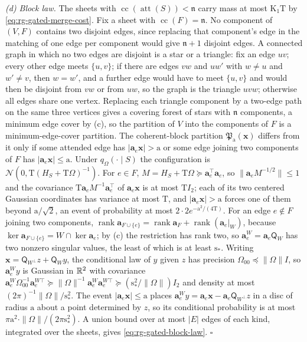 \emph{(d) Block law.} The sheets with
\(\operatorname{cc}(\operatorname{att}(S))<\mathfrak n\) carry mass at most
\(\mathrm K_1\mathrm T\) by \cref{eq:rg-gated-merge-cost}. Fix a sheet with
\(\operatorname{cc}(F)=\mathfrak n\). No component of \((V,F)\) contains
two disjoint edges, since replacing that component's edge in the matching of
one edge per component would give \(\mathfrak n+1\) disjoint edges. A
connected graph in which no two edges are disjoint is a star or a triangle:
fix an edge \(uv\); every other edge meets \(\{u,v\}\); if there are edges
\(vw\) and \(uw'\) with \(w\ne u\) and \(w'\ne v\), then \(w=w'\), and a
further edge would have to meet \(\{u,v\}\) and would then be disjoint from
\(vw\) or from \(uw\), so the graph is the triangle \(uvw\); otherwise all
edges share one vertex. Replacing each triangle component by a two-edge path
on the same three vertices gives a covering forest of stars with
\(\mathfrak n\) components, a minimum edge cover by (c), so the partition
of \(V\) into the components of \(F\) is a minimum-edge-cover partition.
The coherent-block partition \(\mathfrak P_{\mathrm a}(\mathbf x)\) differs
from it only if some attended edge has \(|\mathbf a_e\mathbf x|>\mathrm a\) or
some edge joining two components of \(F\) has
\(|\mathbf a_e\mathbf x|\le\mathrm a\). Under \(q_\Omega(\cdot\mid S)\) the
configuration is \(\mathcal N(0,\mathrm T(H_S+\mathrm T\Omega)^{-1})\). For
\(e\in F\), \(M=H_S+\mathrm T\Omega\succeq\mathbf a_e^\top\mathbf a_e\), so
\(\|\mathbf a_eM^{-1/2}\|\le1\) and the covariance
\(\mathrm T\mathbf a_eM^{-1}\mathbf a_e^\top\) of \(\mathbf a_e\mathbf x\) is at
most \(\mathrm TI_2\); each of its two centered Gaussian coordinates has
variance at most \(\mathrm T\), and \(|\mathbf a_e\mathbf x|>\mathrm a\)
forces one of them beyond \(\mathrm a/\sqrt2\), an event of probability at
most \(2\cdot2e^{-\mathrm a^2/(4\mathrm T)}\). For an edge \(e\notin F\)
joining two components, \(\operatorname{rank}\mathbf a_{F\cup\{e\}}
=\operatorname{rank}\mathbf a_F+\operatorname{rank}(\mathbf a_e|_{W})\),
because \(\ker\mathbf a_{F\cup\{e\}}=W\cap\ker\mathbf a_e\); by (c) the
restriction has rank two, so \(\mathbf a^W_e=\mathbf a_e\mathsf Q_W\) has two nonzero
singular values, the least of which is at least \(\mathrm s_*\). Writing
\(\mathbf x=\mathsf Q_{W^\perp}z+\mathsf Q_Wy\), the conditional law of \(y\)
given \(z\) has precision \(\Omega_{00}\preceq\|\Omega\|I\), so \(\mathbf a^W_ey\) is
Gaussian in \(\mathbb R^2\) with covariance
\(\mathbf a^W_e\Omega_{00}^{-1}\mathbf a^{W\top}_e\succeq\|\Omega\|^{-1}\mathbf a^W_e\mathbf a^{W\top}_e\succeq(\mathrm s_*^2/\|\Omega\|)I_2\)
and density at most \((2\pi)^{-1}\|\Omega\|/\mathrm s_*^2\). The event
\(|\mathbf a_e\mathbf x|\le\mathrm a\) places \(\mathbf a^W_ey=\mathbf a_e\mathbf x-\mathbf a_e\mathsf Q_{W^\perp}z\)
in a disc of radius \(\mathrm a\) about a point determined by \(z\), so its
conditional probability is at most \(\pi\mathrm a^2\cdot\|\Omega\|/(2\pi\mathrm s_*^2)\).
A union bound over at most \(|E|\) edges of each kind, integrated over the
sheets, gives \cref{eq:rg-gated-block-law}. \(\square\)


